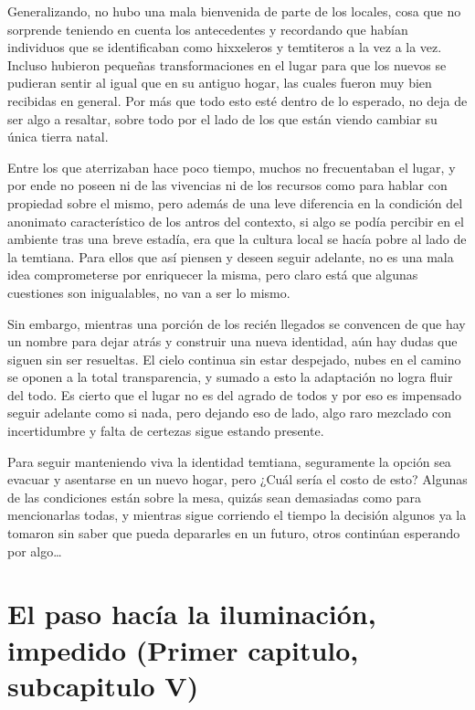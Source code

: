 \documentclass[
  spanish,
]{book}
\begin{document}
Generalizando, no hubo una mala bienvenida de parte de los locales, cosa que no sorprende teniendo en cuenta los antecedentes y recordando que habían individuos que se identificaban como hixxeleros y temtiteros a la vez a la vez. Incluso hubieron pequeñas transformaciones en el lugar para que los nuevos se pudieran sentir al igual que en su antiguo hogar, las cuales fueron muy bien recibidas en general. Por más que todo esto esté dentro de lo esperado, no deja de ser algo a resaltar, sobre todo por el lado de los que están viendo cambiar su única tierra natal.

Entre los que aterrizaban hace poco tiempo, muchos no frecuentaban el lugar, y por ende no poseen ni de las vivencias ni de los recursos como para hablar con propiedad sobre el mismo, pero además de una leve diferencia en la condición del anonimato característico de los antros del contexto, si algo se podía percibir en el ambiente tras una breve estadía, era que la cultura local se hacía pobre al lado de la temtiana. Para ellos que así piensen y deseen seguir adelante, no es una mala idea comprometerse por enriquecer la misma, pero claro está que algunas cuestiones son inigualables, no van a ser lo mismo.

Sin embargo, mientras una porción de los recién llegados se convencen de que hay un nombre para dejar atrás y construir una nueva identidad, aún hay dudas que siguen sin ser resueltas. El cielo continua sin estar despejado, nubes en el camino se oponen a la total transparencia, y sumado a esto la adaptación no logra fluir del todo. Es cierto que el lugar no es del agrado de todos y por eso es impensado seguir adelante como si nada, pero dejando eso de lado, algo raro mezclado con incertidumbre y falta de certezas sigue estando presente.

Para seguir manteniendo viva la identidad temtiana, seguramente la opción sea evacuar y asentarse en un nuevo hogar, pero ¿Cuál sería el costo de esto?
Algunas de las condiciones están sobre la mesa, quizás sean demasiadas como para mencionarlas todas, y mientras sigue corriendo el tiempo la decisión algunos ya la tomaron sin saber que pueda depararles en un futuro, otros continúan esperando por algo\ldots{}

\hypertarget{el-paso-hacuxeda-la-iluminaciuxf3n-impedido-primer-capitulo-subcapitulo-v}{%
\section{El paso hacía la iluminación, impedido (Primer capitulo, subcapitulo V)}\label{el-paso-hacuxeda-la-iluminaciuxf3n-impedido-primer-capitulo-subcapitulo-v}}
\end{document}
